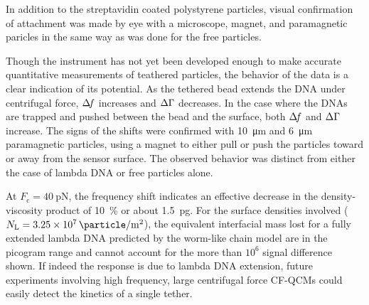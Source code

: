 In addition to the streptavidin coated polystyrene particles, visual
confirmation of attachment was made by eye with a microscope, magnet, and
paramagnetic paricles in the same way as was done for the free particles.

Though the instrument has not yet been developed enough to make accurate
quantitative measurements of teathered particles, the behavior of the data
is a clear indication of its potential.  As the tethered bead extends the
DNA under centrifugal force, $\Delta\!f$ increases and $\Delta\Gamma$ decreases.  In the
case where the DNAs are trapped and pushed between the bead and the
surface, both $\Delta\!f$ and $\Delta\Gamma$ increase.  The signs of the shifts were
confirmed with \SI{10}{\micro\meter} and \SI{6}{\micro\meter} paramagnetic
particles, using a magnet to either pull or push the particles toward or
away from the sensor surface.  The observed behavior  was distinct from
either the case of lambda DNA or free particles alone.

At $F_\mathrm{c}=\SI{40}{\pico\newton}$, the frequency shift indicates an
effective decrease in the density-viscosity product of \SI{10}{\percent} or
about \SI{1.5}{\pico\gram}.  For the surface densities involved
($N_\mathrm{L}=\SI{3.25e7}{\particle\per\meter\squared}$), the equivalent
interfacial mass lost for a fully extended lambda DNA predicted by the
worm-like chain model are in the picogram range and cannot account for the
more than $10^6$ signal difference shown.  If indeed the response is due to
lambda DNA extension, future experiments involving high frequency, large
centrifugal force CF-QCMs could easily detect the kinetics of a single
tether.

